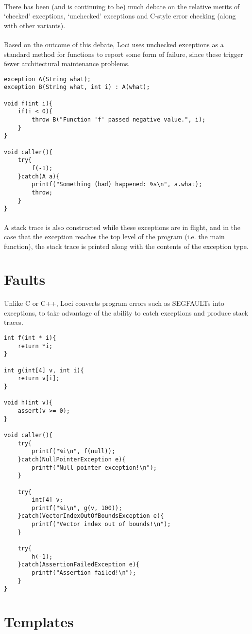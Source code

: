 \documentclass[12pt,twoside,notitlepage]{report}
\begin{document}
\paragraph{}
There has been (and is continuing to be) much debate on the relative merits of `checked' exceptions, `unchecked' exceptions and C-style error checking (along with other variants).

\paragraph{}
Based on the outcome of this debate, Loci uses unchecked exceptions as a standard method for functions to report some form of failure, since these trigger fewer architectural maintenance problems.

\small{
\begin{verbatim}
exception A(String what);
exception B(String what, int i) : A(what);

void f(int i){
    if(i < 0){
        throw B("Function 'f' passed negative value.", i);
    }
}

void caller(){
    try{
        f(-1);
    }catch(A a){
        printf("Something (bad) happened: %s\n", a.what);
        throw;
    }
}
\end{verbatim}
}

\paragraph{}
A stack trace is also constructed while these exceptions are in flight, and in the case that the exception reaches the top level of the program (i.e. the main function), the stack trace is printed along with the contents of the exception type.

\section{Faults}

\paragraph{}
Unlike C or C++, Loci converts program errors such as SEGFAULTs into exceptions, to take advantage of the ability to catch exceptions and produce stack traces.

\small{
\begin{verbatim}
int f(int * i){
    return *i;
}

int g(int[4] v, int i){
    return v[i];
}

void h(int v){
    assert(v >= 0);
}

void caller(){
    try{
        printf("%i\n", f(null));
    }catch(NullPointerException e){
        printf("Null pointer exception!\n");
    }
    
    try{
        int[4] v;
        printf("%i\n", g(v, 100));
    }catch(VectorIndexOutOfBoundsException e){
        printf("Vector index out of bounds!\n");
    }
    
    try{
        h(-1);
    }catch(AssertionFailedException e){
        printf("Assertion failed!\n");
    }
}
\end{verbatim}
}

\section{Templates}
\end{document}
